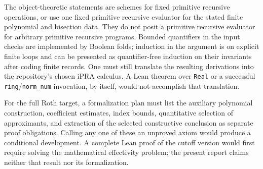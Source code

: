 The object-theoretic statements are schemes for fixed primitive recursive
operations, or use one fixed primitive recursive evaluator for the stated
finite polynomial and bisection data.  They do not posit a primitive
recursive evaluator for arbitrary primitive recursive programs.  Bounded
quantifiers in the input checks are implemented by Boolean folds; induction
in the argument is on explicit finite loops and can be presented as
quantifier-free induction on their invariants after coding finite records.
One must still translate the resulting derivations into the repository's
chosen iPRA calculus.  A Lean theorem over \texttt{Real} or a successful
\texttt{ring}/\texttt{norm\_num} invocation, by itself, would not accomplish
that translation.

For the full Roth target, a formalization plan must list the auxiliary
polynomial construction, coefficient estimates, index bounds, quantitative
selection of approximants, and extraction of the selected constructive
conclusion as separate proof obligations.  Calling any one of these an
unproved axiom would produce a conditional development.  A complete Lean
proof of the cutoff version would first require solving the mathematical
effectivity problem; the present report claims neither that result nor its
formalization.
